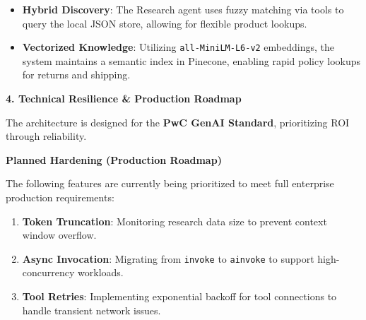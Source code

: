 \documentclass[11pt,a4paper]{article}
\newcommand{\mysection}[1]{%
    \vspace{0.4cm}%
    {\color{lushioblue}\Large\bfseries #1}%
    \par\vspace{0.2cm}%
}
\newcommand{\mysubsection}[1]{%
    \vspace{0.3cm}%
    {\color{pwcgrey}\large\bfseries #1}%
    \par\vspace{0.1cm}%
}
\begin{document}
\begin{itemize}
    \item \textbf{Hybrid Discovery}: The Research agent uses fuzzy matching via tools to query the local JSON store, allowing for flexible product lookups.
    \item \textbf{Vectorized Knowledge}: Utilizing \texttt{all-MiniLM-L6-v2} embeddings, the system maintains a semantic index in Pinecone, enabling rapid policy lookups for returns and shipping.
\end{itemize}

\mysection{4. Technical Resilience \& Production Roadmap}
The architecture is designed for the \textbf{PwC GenAI Standard}, prioritizing ROI through reliability.

\mysubsection{Planned Hardening (Production Roadmap)}
The following features are currently being prioritized to meet full enterprise production requirements:
\begin{enumerate}
    \item \textbf{Token Truncation}: Monitoring research data size to prevent context window overflow.
    \item \textbf{Async Invocation}: Migrating from \texttt{invoke} to \texttt{ainvoke} to support high-concurrency workloads.
    \item \textbf{Tool Retries}: Implementing exponential backoff for tool connections to handle transient network issues.
\end{enumerate}

\vspace{1cm}
\begin{center}
\end{center}
\end{document}
